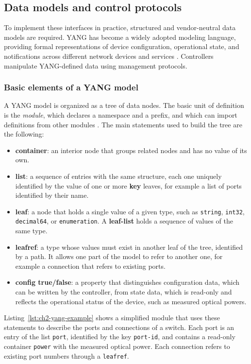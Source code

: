 \subsection{Data models and control protocols}\label{sub:models_and_protocol}
To implement these interfaces in practice, structured and vendor-neutral data models are required.
YANG has become a widely adopted modeling language, providing formal representations of device configuration, operational state, and notifications across different network devices and services \cite{rfc7950}.
Controllers manipulate YANG-defined data using management protocols.

\subsubsection{Basic elements of a YANG model}
A YANG model is organized as a tree of data nodes.
The basic unit of definition is the \textit{module}, which declares a namespace and a prefix, and which can import definitions from other modules \cite{rfc7950}.
The main statements used to build the tree are the following:
\begin{itemize}
    \item \textbf{container}: an interior node that groups related nodes and has no value of its own.
    \item \textbf{list}: a sequence of entries with the same structure, each one uniquely identified by the value of one or more \textbf{key} leaves, for example a list of ports identified by their name.
    \item \textbf{leaf}: a node that holds a single value of a given type, such as \texttt{string}, \texttt{int32}, \texttt{decimal64}, or \texttt{enumeration}. A \textbf{leaf-list} holds a sequence of values of the same type.
    \item \textbf{leafref}: a type whose values must exist in another leaf of the tree, identified by a path. It allows one part of the model to refer to another one, for example a connection that refers to existing ports.
    \item \textbf{config true/false}: a property that distinguishes configuration data, which can be written by the controller, from state data, which is read-only and reflects the operational status of the device, such as measured optical powers.
\end{itemize}

Listing~\ref{lst:ch2-yang-example} shows a simplified module that uses these statements to describe the ports and connections of a switch.
Each port is an entry of the list \texttt{port}, identified by the key \texttt{port-id}, and contains a read-only container \texttt{power} with the measured optical power.
Each connection refers to existing port numbers through a \texttt{leafref}.

